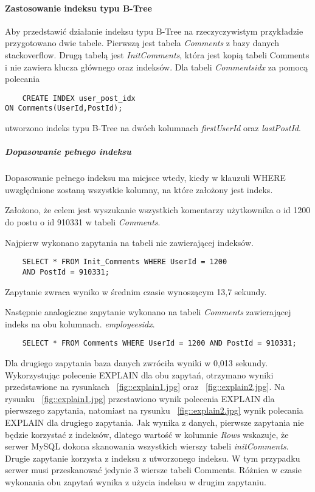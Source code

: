 \paragraph{Zastosowanie indeksu typu B-Tree}\mbox{}

Aby przedstawić działanie indeksu typu B-Tree na rzeczyczywistym przykładzie przygotowano dwie tabele. Pierwszą jest tabela \textit{Comments} z bazy danych stackoverflow. Drugą tabelą jest \textit{Init\textunderscore Comments}, która jest kopią tabeli Comments i nie zawiera klucza głównego oraz indeksów.
Dla tabeli \textit{Comments\textunderscore idx} za pomocą polecania \begin{verbatim}
    CREATE INDEX user_post_idx 
ON Comments(UserId,PostId);
\end{verbatim}
utworzono indeks typu B-Tree na dwóch kolumnach \textit{first\textunderscore UserId} oraz \textit{last\textunderscore PostId}.

\subparagraph{Dopasowanie pełnego indeksu}\mbox{}

Dopasowanie pełnego indeksu ma miejsce wtedy, kiedy w klauzuli WHERE uwzględnione zostaną wszystkie kolumny, na które założony jest indeks. 

Założono, że celem jest wyszukanie wszystkich komentarzy użytkownika o id 1200 do postu o id 910331 w tabeli \textit{Comments}.

Najpierw wykonano zapytania na tabeli nie zawierającej indeksów. 
\begin{verbatim}
    SELECT * FROM Init_Comments WHERE UserId = 1200 
    AND PostId = 910331;
\end{verbatim}
Zapytanie zwraca wyniko w średnim czasie wynoszącym 13,7 sekundy.

Następnie analogiczne zapytanie wykonano na tabeli \textit{Comments} zawierającej indeks na obu kolumnach.
\textit{employees\textunderscore idx}. 
\begin{verbatim}
    SELECT * FROM Comments WHERE UserId = 1200 AND PostId = 910331;
\end{verbatim}
Dla drugiego zapytania baza danych zwróciła wyniki w 0,013 sekundy. Wykorzystując polecenie EXPLAIN dla obu zapytań, otrzymano wyniki przedstawione na rysunkach ~\ref{fig::explain1.jpg} oraz ~\ref{fig::explain2.jpg}. Na rysunku ~\ref{fig::explain1.jpg} przestawiono wynik polecenia EXPLAIN dla pierwszego zapytania, natomiast na rysunku ~\ref{fig::explain2.jpg} wynik polecania EXPLAIN dla drugiego zapytania. Jak wynika z danych, pierwsze zapytania nie będzie korzystać z indeksów, dlatego wartość w kolumnie \textit{Rows} wskazuje, że serwer MySQL dokona skanowania wszystkich wierszy tabeli \textit{init\textunderscore Comments}. Drugie zapytanie korzysta z indeksu z utworzonego indeksu. W tym przypadku serwer musi przeskanować jedynie 3 wiersze tabeli Comments. Różnica w czasie wykonania obu zapytań wynika z użycia indeksu w drugim zapytaniu.


